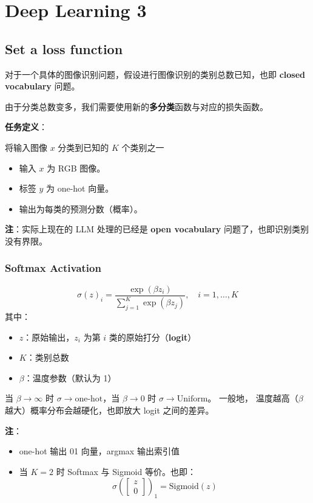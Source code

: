 \section{Deep Learning 3}\label{deep-learning-3}

\subsection{Set a loss function}\label{set-a-loss-function}

对于一个具体的图像识别问题，假设进行图像识别的类别总数已知，也即
\textbf{closed vocabulary} 问题。

由于分类总数变多，我们需要使用新的\textbf{多分类}函数与对应的损失函数。

\textbf{任务定义}：

将输入图像 \(x\) 分类到已知的 \(K\) 个类别之一

\begin{itemize}
\tightlist
\item
  输入 \(x\) 为 RGB 图像。
\item
  标签 \(y\) 为 one-hot 向量。
\item
  输出为每类的预测分数（概率）。
\end{itemize}

\textbf{注}：实际上现在的 LLM 处理的已经是 \textbf{open vocabulary}
问题了，也即识别类别没有界限。

\subsubsection{Softmax Activation}\label{softmax-activation}

\[
\sigma(z)_i = \frac{\exp(\beta z_i)}{\sum_{j=1}^K \exp(\beta z_j)},\quad i=1,\dots,K
\] 其中：

\begin{itemize}
\tightlist
\item
  \(z\)：原始输出，\(z_i\) 为第 \(i\) 类的原始打分（\textbf{logit}）
\item
  \(K\)：类别总数
\item
  \(β\)：温度参数（默认为 1）
\end{itemize}

当 \(\beta \to \infty\) 时 \(\sigma \to \text{one-hot}\)，当
\(\beta \to 0\) 时 \(\sigma \to \text{Uniform}\)。 一般地，
温度越高（\(\beta\) 越大）概率分布会越硬化，也即放大 logit 之间的差异。

\textbf{注}：

\begin{itemize}
\tightlist
\item
  one-hot 输出 01 向量，argmax 输出索引值
\item
  当 \(K=2\) 时 Softmax 与 Sigmoid 等价。也即： \[
    \sigma\left(\begin{bmatrix} z \\ 0 \end{bmatrix} \right)_1 = \text{Sigmoid}(z)
    \]
\end{itemize}

